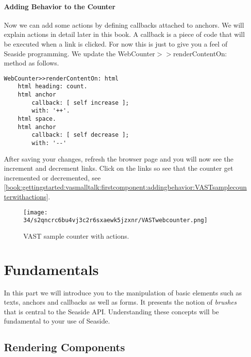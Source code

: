 \documentclass[a4paper,10pt,twoside]{book}
\newcommand{\ct}[1]{{\small\ttfamily\textup{#1}}}
\begin{document}
\subsection{Adding Behavior to the Counter}
\label{book:gettingstarted:vasmalltalk:firstcomponent:addingbehavior}

Now we can add some actions by defining callbacks attached to anchors. We will explain actions in detail later in this book. A callback is a piece of code that will be executed when a link is clicked. For now this is just to give you a feel of Seaside programming. We update the \ct{WebCounter$>$$>$renderContentOn:} method as follows.

\begin{lstlisting}
WebCounter>>renderContentOn: html
    html heading: count.
    html anchor 
        callback: [ self increase ];
        with: '++'.
    html space.
    html anchor
        callback: [ self decrease ];
        with: '--'
\end{lstlisting}

After saving your changes, refresh the browser page and you will now see the increment and decrement links.  Click on the links so see that the counter get incremented or decremented, see \autoref{book:gettingstarted:vasmalltalk:firstcomponent:addingbehavior:VASTsamplecounterwithactions}.

\begin{figure}[h!tbp]
	\begin{center}
		\texttt{[image: 34/s2qncrc6bu4vj3c2r6sxaewk5jzxnr/VASTwebcounter.png]}
		\caption{VAST sample counter with actions.\label{book:gettingstarted:vasmalltalk:firstcomponent:addingbehavior:VASTsamplecounterwithactions}}
	\end{center}
\end{figure}


\part{Fundamentals}
\label{book:fundamentals}

In this part we will introduce you to the manipulation of basic elements such as texts, anchors and callbacks as well as forms. It presents the notion of \textit{brushes} that is central to the Seaside API. Understanding these concepts will be fundamental to your use of Seaside.

\chapter{Rendering Components}
\label{book:fundamentals:renderingcomponents}
\end{document}
